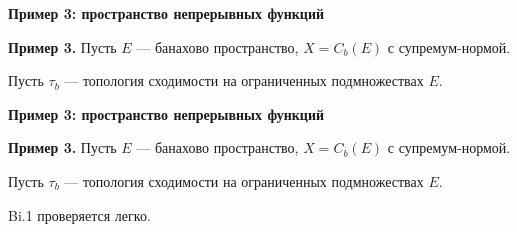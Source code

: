 \documentclass[11pt]{article}
\begin{document}
\newpage

\begin{center}
{\color{notaeYELLOW}\bfseries\fontsize{44}{52}\selectfont Пример 3: пространство непрерывных функций}
\end{center}
\vspace*{\fill}
\begin{center}
\fontsize{36}{43}\selectfont
\parbox{\linewidth}{\centering\noindent \textbf{Пример 3.} Пусть $E$ --- банахово пространство, $X=C_b(E)$ с супремум-нормой.
\par}\vspace{0.4in}
\parbox{\linewidth}{\centering\noindent Пусть $\tau_b$ --- топология сходимости на ограниченных подмножествах $E$.
\par}\vspace{0.4in}
\end{center}
\vspace*{\fill}

\newpage

\begin{center}
{\color{notaeYELLOW}\bfseries\fontsize{44}{52}\selectfont Пример 3: пространство непрерывных функций}
\end{center}
\vspace*{\fill}
\begin{center}
\fontsize{36}{43}\selectfont
\parbox{\linewidth}{\centering\noindent \textbf{Пример 3.} Пусть $E$ --- банахово пространство, $X=C_b(E)$ с супремум-нормой.
\par}\vspace{0.4in}
\parbox{\linewidth}{\centering\noindent Пусть $\tau_b$ --- топология сходимости на ограниченных подмножествах $E$.
\par}\vspace{0.4in}
\parbox{\linewidth}{\centering\noindent Bi.1 проверяется легко.
\par}\vspace{0.4in}
\end{center}
\vspace*{\fill}

\newpage
\end{document}

